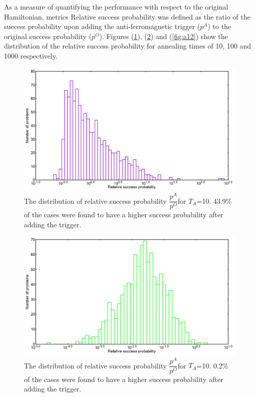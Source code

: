 \documentclass[12]{article}
\begin{document}
As a measure of quantifying the performance with respect to the original Hamiltonian, metrics Relative success probability was defined as the ratio of the success probability upon adding the anti-ferromagnetic trigger ($p^A$) to the original success probability ($p^O$). Figures (\ref{fig:a10}), (\ref{fig:a11}) and (\ref{fig:a12}) show the  distribution of the relative success probability for annealing times of 10, 100 and 1000 respectively. 

\begin{figure}[H]
\centering 
\includegraphics[scale=0.3]{A_T10_g0.png}
\caption{The distribution of relative success probability $\dfrac{p^A}{p^O}$for $T_A$=10. 43.9\% of the cases were found to have a higher success probability after adding the trigger.}
\label{fig:a10}
\end{figure}
\begin{figure}[H]
\centering 
\includegraphics[scale=0.3]{A_T100_g0.png}
\caption{The distribution of relative success probability $\dfrac{p^A}{p^O}$for $T_A$=10. 0.2\% of the cases were found to have a higher success probability after adding the trigger. }
\label{fig:a11}
\end{figure}
\end{document}
